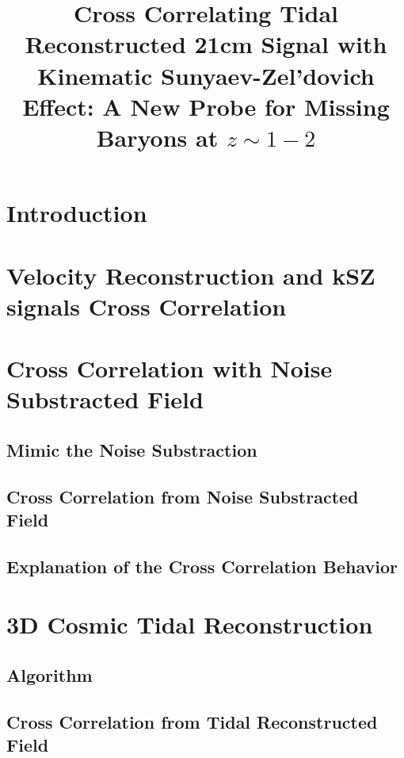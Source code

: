 \documentclass[aps,prd,twocolumn,showpacs,superscriptaddress,groupedaddress,nofootinbib]{revtex4}  %
\begin{document}
\widetext

\title{Cross Correlating Tidal Reconstructed 21cm Signal with Kinematic Sunyaev-Zel'dovich Effect: A New Probe for Missing Baryons at $z\sim1-2$}


\pacs{}
\maketitle

\section{Introduction}


\section{Velocity Reconstruction and kSZ signals Cross Correlation}

\section{Cross Correlation with Noise Substracted Field} 
\subsection{Mimic the Noise Substraction}

\subsection{Cross Correlation from Noise Substracted Field}

\subsection{Explanation of the Cross Correlation Behavior}

\section{3D Cosmic Tidal Reconstruction}
\subsection{Algorithm}

\subsection{Cross Correlation from Tidal Reconstructed Field}

\end{document}
